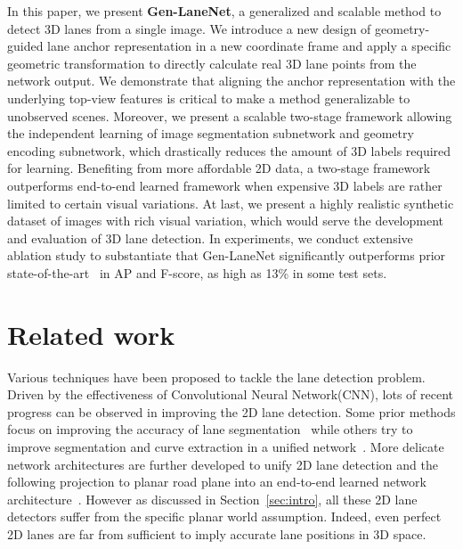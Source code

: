 \documentclass[10pt,twocolumn,letterpaper]{article}
\begin{document}
In this paper, we present \textbf{Gen-LaneNet}, a generalized and scalable method to detect 3D lanes from a single image. We introduce a new design of geometry-guided lane anchor representation in a new coordinate frame and apply a specific geometric transformation to directly calculate real 3D lane points from the network output. We demonstrate that aligning the anchor representation with the underlying top-view features is critical to make a method generalizable to  unobserved scenes. Moreover, we present a scalable two-stage framework allowing the independent learning of image segmentation subnetwork and geometry encoding subnetwork, which drastically reduces the amount of 3D labels required for learning. Benefiting from more affordable 2D data, a two-stage framework outperforms end-to-end learned framework when expensive 3D labels are rather limited to certain visual variations. At last, we present a highly realistic synthetic dataset of images with rich visual variation, which would serve the development and evaluation of 3D lane detection. In experiments, we conduct extensive ablation study to substantiate that Gen-LaneNet significantly outperforms prior state-of-the-art~\cite{Garnett:etal:ICCV2019} in AP and F-score, as high as 13\% in some test sets.
















\section{Related work}
\label{sec:related:work}

Various techniques have been proposed to tackle the lane detection problem. Driven by the effectiveness of Convolutional Neural Network(CNN), lots of recent progress can be observed in improving the 2D lane detection. Some prior methods focus on improving the accuracy of lane segmentation~\cite{DualCNN2016,EmpiricalEval2015,RandomSample2014,HoughLaneMark2012,RobustLane2018,EToE2018,DeepSemantic2018,Pan:etal:AAAI2018,Hou:etal:ICCV2019} while others try to improve segmentation and curve extraction in a unified network~\cite{DNNTraffic2016,Philion:CVPR2019}. More delicate network architectures are further developed to unify 2D lane detection and the following projection to planar road plane into an end-to-end learned network architecture~\cite{Lee:etal:vpgnet:ICCV2017,Kheyrollahi:2012:ARR,DualCNN2016,Neven:etal:IV2018,Brabandere:etal:CoRR2019}. However as discussed in Section~\ref{sec:intro}, all these 2D lane detectors suffer from the specific planar world assumption. Indeed, even perfect 2D lanes are far from sufficient to imply accurate lane positions in 3D space.
\end{document}
